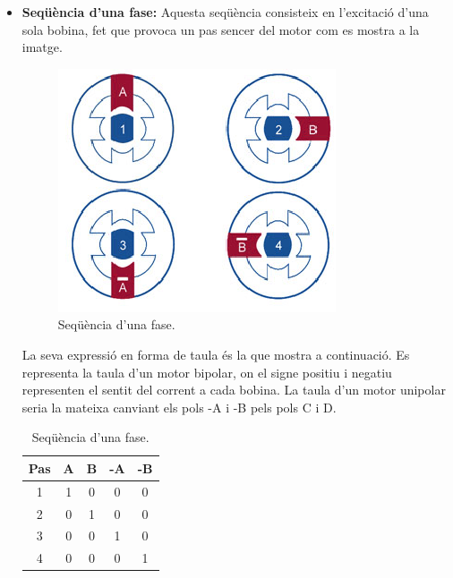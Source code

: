 \begin{itemize}
	\item \textbf{Seqüència d'una fase:} Aquesta seqüència consisteix en l'excitació d'una sola bobina, fet que provoca un pas sencer del motor com es mostra a la imatge.  
	\begin{figure}[H]
		\centering
		\includegraphics[scale=1.2]{Sequencia_1_fase.eps}
		\caption{Seqüència d'una fase.}
		\label{fig:1fase}
	\end{figure}
	La seva expressió en forma de taula és la que mostra a continuació. Es representa la taula d'un motor bipolar, on el signe positiu i negatiu representen el sentit del corrent a cada bobina. La taula d'un motor unipolar seria la mateixa canviant els pols -A i -B pels pols C i D.

	\begin{table}[H]
		\begin{center}
			\begin{tabular}{|c||c|c|c|c|}
				\hline
				Pas & A & B & -A & -B \\
				\hline \hline
				1 & 1 & 0 & 0 & 0 \\ \hline
				2 & 0 & 1 & 0 & 0 \\ \hline
				3 & 0 & 0 & 1 & 0 \\ \hline
				4 & 0 & 0 & 0 & 1 \\ \hline
			\end{tabular}
			\caption{Seqüència d'una fase.}
			\label{tabla:1fase}
		\end{center}
	\end{table}
	

\end{itemize}
